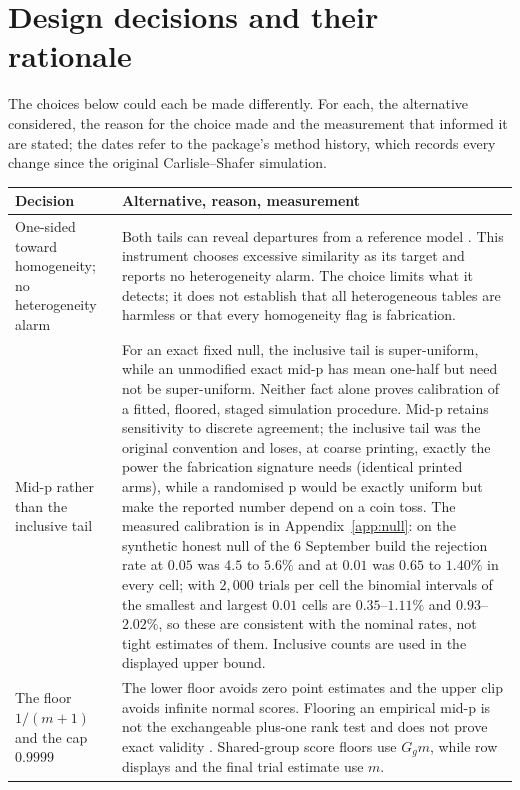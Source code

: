 \documentclass[11pt,a4paper]{article}
\begin{document}
\section{Design decisions and their rationale}
\label{sec:decisions}

The choices below could each be made differently. For each, the alternative considered, the reason for the choice made and the measurement that informed it are stated; the dates refer to the package's method history, which records every change since the original Carlisle--Shafer simulation.

\begin{longtable}{>{\raggedright\arraybackslash}p{} >{\raggedright\arraybackslash}p{}}
\toprule
Decision & Alternative, reason, measurement \\
\midrule
\endhead
One-sided toward homogeneity; no heterogeneity alarm &
Both tails can reveal departures from a reference model \citep{carlisle2017}. This instrument chooses excessive similarity as its target and reports no heterogeneity alarm. The choice limits what it detects; it does not establish that all heterogeneous tables are harmless or that every homogeneity flag is fabrication. \\
\addlinespace
Mid-p rather than the inclusive tail &
For an exact fixed null, the inclusive tail is super-uniform, while an unmodified exact mid-p has mean one-half but need not be super-uniform. Neither fact alone proves calibration of a fitted, floored, staged simulation procedure. Mid-p retains sensitivity to discrete agreement; the inclusive tail was the original convention and loses, at coarse printing, exactly the power the fabrication signature needs (identical printed arms), while a randomised p would be exactly uniform but make the reported number depend on a coin toss. The measured calibration is in Appendix~\ref{app:null}: on the synthetic honest null of the 6 September build the rejection rate at $0.05$ was $4.5$ to $5.6\%$ and at $0.01$ was $0.65$ to $1.40\%$ in every cell; with $2{,}000$ trials per cell the binomial intervals of the smallest and largest $0.01$ cells are $0.35$--$1.11\%$ and $0.93$--$2.02\%$, so these are consistent with the nominal rates, not tight estimates of them. Inclusive counts are used in the displayed upper bound. \\
\addlinespace
The floor $1/(m+1)$ and the cap $0.9999$ &
The lower floor avoids zero point estimates and the upper clip avoids infinite normal scores. Flooring an empirical mid-p is not the exchangeable plus-one rank test and does not prove exact validity \citep{phipson2010}. Shared-group score floors use $G_gm$, while row displays and the final trial estimate use $m$. \\

\end{longtable}
\end{document}
